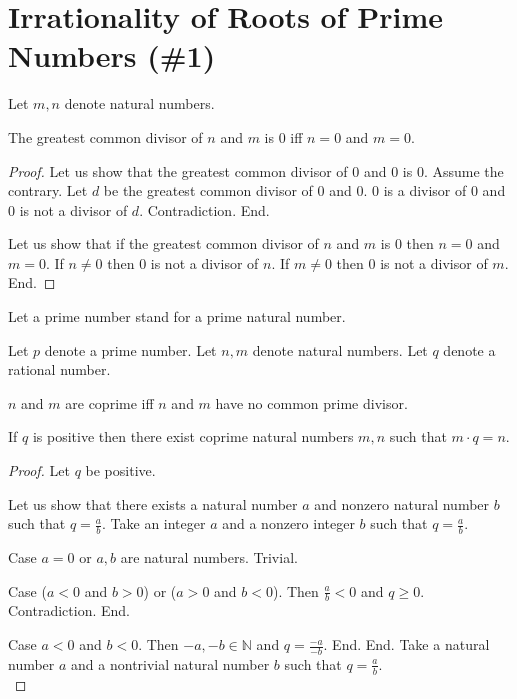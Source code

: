 \documentclass{article}
\begin{document}
\section{Irrationality of Roots of Prime Numbers (\#1)}

\begin{forthel}
Let $m,n$ denote natural numbers.

\begin{lemma}
The greatest common divisor of $n$ and $m$ is 0 iff $n = 0$ and $m = 0$.
\end{lemma}
\begin{proof}
Let us show that the greatest common divisor of 0 and 0 is 0.
  Assume the contrary. Let $d$ be the greatest common divisor of 0 and 0.
  0 is a divisor of 0 and 0 is not a divisor of $d$. Contradiction. End.

Let us show that if the greatest common divisor of $n$ and $m$ is 0 then $n = 0$ and $m = 0$.
  If $n \neq 0$ then 0 is not a divisor of $n$.
  If $m \neq 0$ then 0 is not a divisor of $m$.
End.
\end{proof}

  Let a prime number stand for a prime natural number.

    Let $p$ denote a prime number.
    Let $n,m$ denote natural numbers.
    Let $q$ denote a rational number.

    \begin{definition}
      $n$ and $m$ are coprime iff $n$ and $m$ have no common prime divisor.
    \end{definition}

    \begin{lemma}
      If $q$ is positive then there exist coprime natural numbers $m,n$ such that $m \cdot q = n$.
    \end{lemma}
\begin{proof}
Let $q$ be positive.

Let us show that there exists a natural number $a$ and nonzero natural number $b$ such that $q = \frac{a}{b}$.
  Take an integer $a$ and a nonzero integer $b$ such that $q = \frac{a}{b}$.

  Case $a = 0$ or $a,b$ are natural numbers. Trivial.

  Case ($a < 0$ and $b > 0$) or ($a > 0$ and $b < 0$). Then $\frac{a}{b} < 0$ and $q \geq 0$. Contradiction. End.

  Case $a < 0$ and $b < 0$. Then $-a,-b \in \mathbb{N}$ and $q = \frac{-a}{-b}$. End.
End.
Take a natural number $a$ and a nontrivial natural number $b$ such that $q = \frac{a}{b}$.\\


\end{proof}
\end{forthel}
\end{document}
